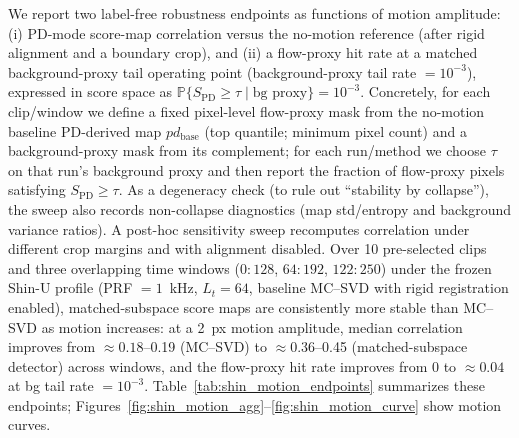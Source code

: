 We report two label-free robustness endpoints as functions of motion amplitude: (i) PD-mode score-map correlation versus the no-motion reference (after rigid alignment and a boundary crop), and (ii) a flow-proxy hit rate at a matched background-proxy tail operating point (background-proxy tail rate $=10^{-3}$), expressed in score space as $\mathbb{P}\{S_{\mathrm{PD}}\ge\tau\mid \text{bg proxy}\}=10^{-3}$. Concretely, for each clip/window we define a fixed pixel-level flow-proxy mask from the no-motion baseline PD-derived map $pd_{\mathrm{base}}$ (top quantile; minimum pixel count) and a background-proxy mask from its complement; for each run/method we choose $\tau$ on that run's background proxy and then report the fraction of flow-proxy pixels satisfying $S_{\mathrm{PD}}\ge\tau$. As a degeneracy check (to rule out ``stability by collapse''), the sweep also records non-collapse diagnostics (map std/entropy and background variance ratios). A post-hoc sensitivity sweep recomputes correlation under different crop margins and with alignment disabled.
Over 10 pre-selected clips and three overlapping time windows ($0{:}128$, $64{:}192$, $122{:}250$) under the frozen Shin-U profile (PRF $=1$~kHz, $L_t=64$, baseline MC--SVD with rigid registration enabled), matched-subspace score maps are consistently more stable than MC--SVD as motion increases: at a 2~px motion amplitude, median correlation improves from $\approx 0.18$--0.19 (MC--SVD) to $\approx 0.36$--0.45 (matched-subspace detector) across windows, and the flow-proxy hit rate improves from 0 to $\approx 0.04$ at bg tail rate $=10^{-3}$. Table~\ref{tab:shin_motion_endpoints} summarizes these endpoints; Figures~\ref{fig:shin_motion_agg}--\ref{fig:shin_motion_curve} show motion curves.

